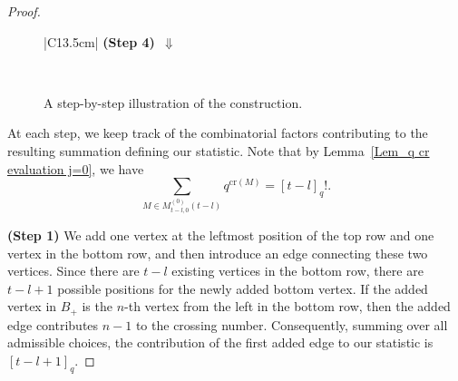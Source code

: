 \documentclass{amsart}
\newcommand{\Cr}{\mathrm{cr}}
\theoremstyle{plain}
\theoremstyle{remark}
\numberwithin{equation}{section}
\begin{document}
\begin{proof}
\begin{figure}[h]
\begin{tabular}{|C{13.5cm}|}
{\centering
\textbf{(Step 4)}\ $\Downarrow$}
\\ \hline
\smallskip 
        \smallskip 
\\ \hline

\end{tabular}

\caption{A step-by-step illustration of the construction.}
\label{fig:construction_steps}
\end{figure}

At each step, we keep track of the combinatorial factors contributing to the resulting summation defining our statistic. 
Note that by Lemma~\ref{Lem_q cr evaluation j=0}, we have 
   \begin{equation} \label{factor in Step0}
        \sum_{M\in M_{t-l,0}^{(0)}(t-l)}q^{\Cr(M)}=  [t-l]_{q}!.
    \end{equation} 
    
\smallskip 

\noindent \textbf{(Step 1)} We add one vertex at the leftmost position of the top row and one vertex in the bottom row, and then introduce an edge connecting these two vertices.
Since there are $t-l$ existing vertices in the bottom row, there are $t-l+1$ possible positions for the newly added bottom vertex. 
If the added vertex in $B_+$ is the $n$-th vertex from the left in the bottom row, then the added edge contributes $n-1$ to the crossing number.
Consequently, summing over all admissible choices, the contribution of the first added edge to our statistic is $[t-l+1]_q$.


\end{proof}
\end{document}
